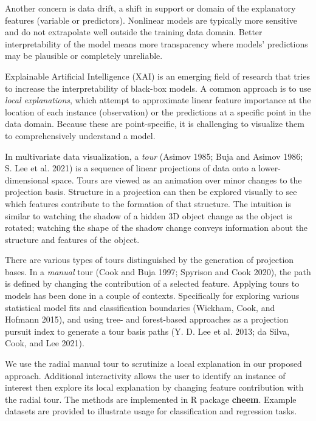 \documentclass[
]{article}
\begin{document}
Another concern is data drift, a shift in support or domain of the explanatory features (variable or predictors). Nonlinear models are typically more sensitive and do not extrapolate well outside the training data domain. Better interpretability of the model means more transparency where models' predictions may be plausible or completely unreliable.

Explainable Artificial Intelligence (XAI) is an emerging field of research that tries to increase the interpretability of black-box models. A common approach is to use \emph{local explanations}, which attempt to approximate linear feature importance at the location of each instance (observation) or the predictions at a specific point in the data domain. Because these are point-specific, it is challenging to visualize them to comprehensively understand a model.

In multivariate data visualization, a \emph{tour} (Asimov 1985; Buja and Asimov 1986; S. Lee et al. 2021) is a sequence of linear projections of data onto a lower-dimensional space. Tours are viewed as an animation over minor changes to the projection basis. Structure in a projection can then be explored visually to see which features contribute to the formation of that structure. The intuition is similar to watching the shadow of a hidden 3D object change as the object is rotated; watching the shape of the shadow change conveys information about the structure and features of the object.

There are various types of tours distinguished by the generation of projection bases. In a \emph{manual} tour (Cook and Buja 1997; Spyrison and Cook 2020), the path is defined by changing the contribution of a selected feature. Applying tours to models has been done in a couple of contexts. Specifically for exploring various statistical model fits and classification boundaries (Wickham, Cook, and Hofmann 2015), and using tree- and forest-based approaches as a projection pursuit index to generate a tour basis paths (Y. D. Lee et al. 2013; da Silva, Cook, and Lee 2021).

We use the radial manual tour to scrutinize a local explanation in our proposed approach. Additional interactivity allows the user to identify an instance of interest then explore its local explanation by changing feature contribution with the radial tour. The methods are implemented in R package \textbf{cheem}. Example datasets are provided to illustrate usage for classification and regression tasks.
\end{document}
